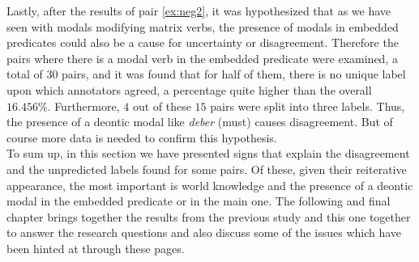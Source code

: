 Lastly, after the results of pair \ref{ex:neg2}, it was hypothesized that as we have seen with modals modifying matrix verbs, the presence of modals in embedded predicates could also be a cause for uncertainty or disagreement. Therefore the pairs where there is a modal verb in the embedded predicate were examined, a total of 30 pairs, and it was found that for half of them, there is no unique label upon which annotators agreed, a percentage quite higher than the overall $16.456\%$. Furthermore, $4$ out of these $15$ pairs were split into three labels. Thus, the presence of a deontic modal like \textit{deber} (must) causes disagreement. But of course more data is needed to confirm this hypothesis.\\

To sum up, in this section we have presented signs that explain the disagreement and the unpredicted labels found for some pairs. Of these, given their reiterative appearance, the most important is world knowledge and the presence of a deontic modal in the embedded predicate or in the main one. The following and final chapter brings together the results from the previous study and this one together to answer the research questions and also discuss some of the issues which have been hinted at through these pages.\\